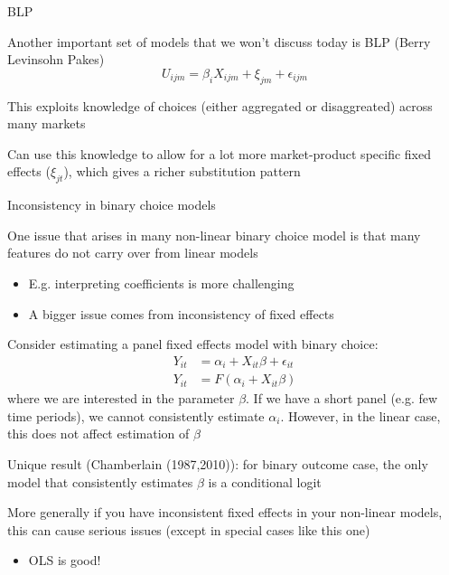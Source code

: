 \documentclass[notes,11pt, aspectratio=169]{beamer}
\newenvironment{wideitemize}{\itemize\addtolength{\itemsep}{10pt}}{\enditemize}
\begin{document}
\begin{frame}{BLP}
  \begin{wideitemize}
  \item Another important set of models that we won't discuss today is
    BLP (Berry Levinsohn Pakes)
    $$ U_{ijm} = \beta_{i}X_{ijm} + \xi_{jm} + \epsilon_{ijm}$$
  \item This exploits knowledge of choices (either aggregated or
    disaggreated) across many markets
  \item Can use this knowledge to allow for a lot more market-product
    specific fixed effects ($\xi_{jt}$), which gives a richer
    substitution pattern
  \end{wideitemize}
\end{frame}

\begin{frame}{Inconsistency in binary choice models}
  \begin{wideitemize}
  \item One issue that arises in many non-linear binary choice model is that many
    features do not carry over from linear models
    \begin{itemize}
    \item E.g. interpreting coefficients is more challenging
    \item A bigger issue comes from  inconsistency of fixed effects
    \end{itemize}
\vspace{-5pt}    
  \item Consider estimating a panel fixed effects model with binary choice:
    \begin{align*}
      Y_{it} &= \alpha_{i} + X_{it}\beta + \epsilon_{it}\\
      Y_{it} &= F(\alpha_{i} + X_{it}\beta)
    \end{align*}
    where we are interested in the parameter $\beta$. If we have a
    short panel (e.g. few time periods), we cannot consistently
    estimate $\alpha_{i}$. However, in the linear case, this does not
    affect estimation of $\beta$
  \item Unique result (Chamberlain (1987,2010)): for binary
    outcome case, the only model that
    consistently estimates $\beta$ is a conditional logit
  \item More generally if you have inconsistent fixed effects in your
    non-linear models, this can cause serious issues (except in
    special cases like this one)
    \begin{itemize}
    \item OLS is good!
    \end{itemize}
  \end{wideitemize}
\end{frame}
\end{document}
